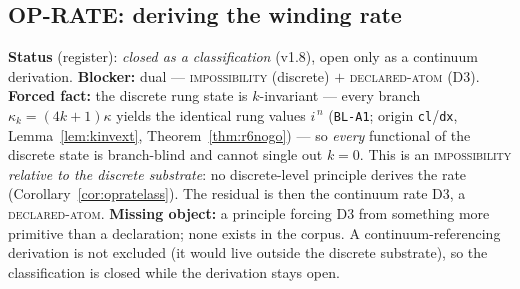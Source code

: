 \documentclass[11pt]{article}
\newcommand{\hx}[1]{\textcolor{cC}{\footnotesize\texttt{#1}}}
\theoremstyle{plain}
\theoremstyle{definition}
\theoremstyle{remark}
\begin{document}
\subsection{OP-RATE: deriving the winding rate}\label{blk:rate}
\textbf{Status} (register): \emph{closed as a classification} (v1.8), open only as a
continuum derivation. \textbf{Blocker:} dual --- \textsc{impossibility}
(discrete) $+$ \textsc{declared-atom} (D3). \textbf{Forced fact:} the discrete
rung state is $k$-invariant --- every branch $\kappa_k=(4k+1)\kappa$ yields the
identical rung values $i^{\,n}$ (\hx{BL-A1}; origin \texttt{cl}/\texttt{dx},
Lemma~\ref{lem:kinvext}, Theorem~\ref{thm:r6nogo}) --- so \emph{every} functional
of the discrete state is branch-blind and cannot single out $k=0$. This is an
\textsc{impossibility} \emph{relative to the discrete substrate}: no
discrete-level principle derives the rate (Corollary~\ref{cor:opratelass}). The
residual is then the continuum rate D3, a \textsc{declared-atom}.
\textbf{Missing object:} a principle forcing D3 from something more primitive
than a declaration; none exists in the corpus. A continuum-referencing
derivation is not excluded (it would live outside the discrete substrate), so
the classification is closed while the derivation stays open.
\end{document}
